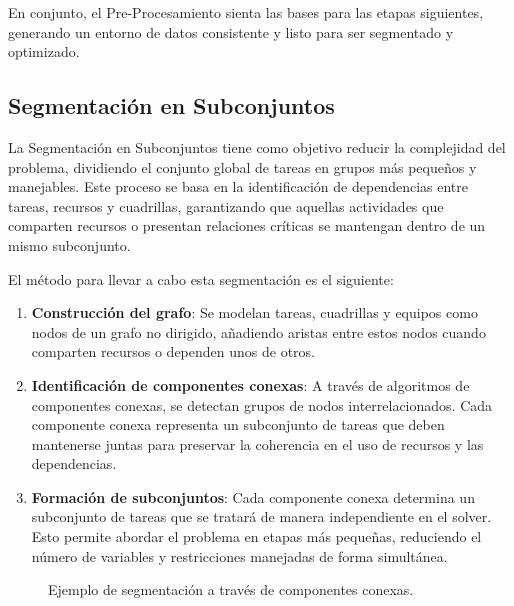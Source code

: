 \documentclass{article}
\begin{document}
En conjunto, el Pre-Procesamiento sienta las bases para las etapas siguientes, generando un entorno de datos consistente y listo para ser segmentado y optimizado.


\subsection{Segmentación en Subconjuntos}

La Segmentación en Subconjuntos tiene como objetivo reducir la complejidad del problema, dividiendo el conjunto global de tareas en grupos más pequeños y manejables. Este proceso se basa en la identificación de dependencias entre tareas, recursos y cuadrillas, garantizando que aquellas actividades que comparten recursos o presentan relaciones críticas se mantengan dentro de un mismo subconjunto.

El método para llevar a cabo esta segmentación es el siguiente:

\begin{enumerate}[label=\alph*.]
    \item \textbf{Construcción del grafo}: Se modelan tareas, cuadrillas y equipos como nodos de un grafo no dirigido, añadiendo aristas entre estos nodos cuando comparten recursos o dependen unos de otros.
    
    \item \textbf{Identificación de componentes conexas}: A través de algoritmos de componentes conexas, se detectan grupos de nodos interrelacionados. Cada componente conexa representa un subconjunto de tareas que deben mantenerse juntas para preservar la coherencia en el uso de recursos y las dependencias.

    \item \textbf{Formación de subconjuntos}: Cada componente conexa determina un subconjunto de tareas que se tratará de manera independiente en el solver. Esto permite abordar el problema en etapas más pequeñas, reduciendo el número de variables y restricciones manejadas de forma simultánea.
\end{enumerate}


\begin{figure}[htbp]
    \centering
    \caption{Ejemplo de segmentación a través de componentes conexas.}
    \label{fig:segmentacion}
\end{figure}
\end{document}

